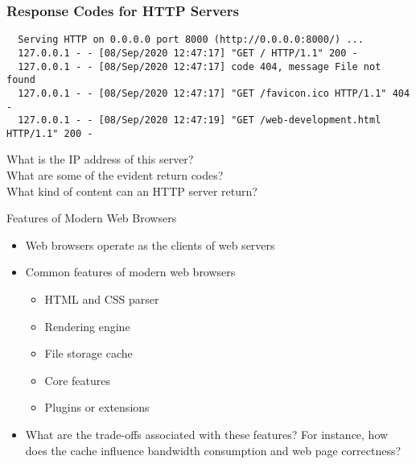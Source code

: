 \documentclass[14pt,aspectratio=169]{beamer}
\begin{document}
%
\begin{frame}[fragile]
  \frametitle{Response Codes for HTTP Servers}
  \normalsize
  \hspace*{-.15in}
  \begin{minipage}{6in}
    \vspace*{.25in}
    \begin{verbatim}
  Serving HTTP on 0.0.0.0 port 8000 (http://0.0.0.0:8000/) ...
  127.0.0.1 - - [08/Sep/2020 12:47:17] "GET / HTTP/1.1" 200 -
  127.0.0.1 - - [08/Sep/2020 12:47:17] code 404, message File not found
  127.0.0.1 - - [08/Sep/2020 12:47:17] "GET /favicon.ico HTTP/1.1" 404 -
  127.0.0.1 - - [08/Sep/2020 12:47:19] "GET /web-development.html HTTP/1.1" 200 -
    \end{verbatim}
  \end{minipage}
  \vspace*{.25in}
  \begin{center}
    \normalsize \noindent What is the IP address of this server? \\
    \normalsize \noindent What are some of the evident return codes? \\
    \normalsize \noindent What kind of content can an HTTP server return? \\
  \end{center}
\end{frame}

%
\begin{frame}{Features of Modern Web Browsers}
  \begin{itemize}
    \item Web browsers operate as the clients of web servers
      \vspace*{-.1in}
    \item Common features of modern web browsers
      \begin{itemize}
        \item HTML and CSS parser
        \item Rendering engine
        \item File storage cache
        \item Core features
        \item Plugins or extensions
      \end{itemize}
      \vspace*{-.2in}
    \item What are the trade-offs associated with these features? For instance,
      how does the cache influence bandwidth consumption and web page
      correctness?
  \end{itemize}
\end{frame}
\end{document}
